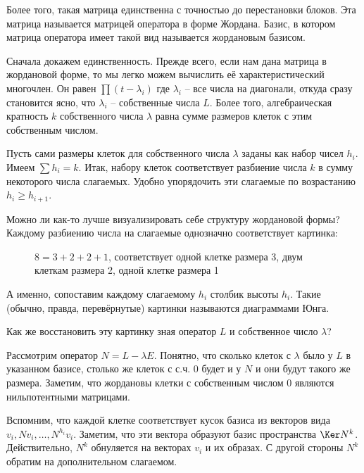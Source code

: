 Более того, такая матрица единственна с точностью до перестановки блоков. Эта матрица называется матрицей оператора в форме Жордана. Базис, в котором матрица оператора имеет такой вид называется жордановым базисом.
\ethrm
\proof

Сначала докажем единственность. Прежде всего, если нам дана матрица в жордановой форме, то мы легко можем вычислить её характеристический многочлен. Он равен $\prod (t-\lambda_i)$ где $\lambda_i$ -- все числа на диагонали, откуда сразу становится ясно, что $\lambda_i$ -- собственные числа $L$. Более того, алгебраическая кратность
$k$ собственного числа $\lambda$ равна сумме размеров клеток с этим собственным числом.

Пусть сами размеры клеток для собственного числа $\lambda$ заданы как набор чисел $h_i$. Имеем
$\sum h_i =k.$
Итак, набору клеток соответствует разбиение числа $k$ в сумму некоторого числа слагаемых. Удобно упорядочить эти слагаемые по возрастанию $h_i\geq h_{i+1}$.

Можно ли как-то лучше визуализировать себе структуру жордановой формы?
Каждому разбиению числа на слагаемые однозначно соответствует картинка:


\begin{figure}[hhh]
\begin{center}
\end{center}
\caption{$8=3+2+2+1$, соответствует одной клетке размера 3, двум клеткам размера 2, одной клетке размера 1}
\end{figure}

А именно, сопоставим каждому слагаемому $h_i$ столбик высоты $h_i$. Такие (обычно, правда, перевёрнутые) картинки называются диаграммами Юнга.

Как же восстановить эту картинку зная оператор $L$ и собственное число $\lambda$?

Рассмотрим оператор $N=L-\lambda E$. Понятно, что сколько клеток с $\lambda$ было у $L$ в указанном базисе, столько же клеток с с.ч. 0 будет и у $N$ и они будут такого же размера.
Заметим, что жордановы клетки с собственным числом 0 являются нильпотентными матрицами.



Вспомним, что каждой клетке соответствует кусок базиса из векторов вида  $v_i, N v_i, \dots,N^{h_i} v_i$. Заметим, что эти вектора образуют базис пространства $\Ker N^k$. Действительно, $N^k$ обнуляется на векторах $v_i$ и их образах. С другой стороны $N^k$ обратим на дополнительном слагаемом.

